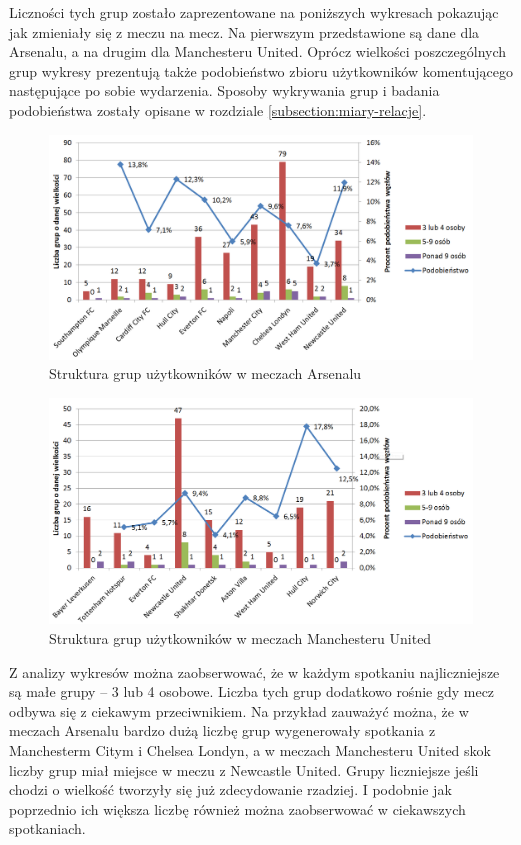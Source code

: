 Liczności tych grup zostało zaprezentowane na poniższych
wykresach pokazując jak zmieniały się z meczu na mecz.
Na pierwszym  przedstawione są dane
dla Arsenalu, a na drugim  dla Manchesteru United.
Oprócz wielkości poszczególnych grup wykresy prezentują także podobieństwo
zbioru użytkowników komentującego następujące po sobie wydarzenia.
Sposoby wykrywania grup i badania podobieństwa zostały opisane w rozdziale
\ref{subsection:miary-relacje}.
 
\begin{figure}[ht!]
\centering
\includegraphics[width=160mm]{img/grupy-arsenal-nums.png}
\caption{Struktura grup użytkowników w meczach Arsenalu}
\label{image:grupy-arsenal}
\end{figure}

\begin{figure}[ht!]
\centering
\includegraphics[width=160mm]{img/grupy-munited-nums.png}
\caption{Struktura grup użytkowników w meczach Manchesteru United}
\label{image:grupy-munited}
\end{figure}


Z analizy wykresów można zaobserwować, że w każdym spotkaniu najliczniejsze
są małe grupy -- 3 lub 4 osobowe. Liczba tych grup dodatkowo rośnie gdy
mecz odbywa się z ciekawym przeciwnikiem. Na przykład zauważyć można, że
w meczach Arsenalu  bardzo dużą liczbę grup wygenerowały
spotkania z Manchesterm Citym i Chelsea Londyn, a w meczach Manchesteru United
skok liczby grup miał miejsce w meczu z Newcastle United.
Grupy liczniejsze jeśli chodzi o wielkość tworzyły się już zdecydowanie rzadziej.
I podobnie jak poprzednio ich większa liczbę również można zaobserwować
w ciekawszych spotkaniach.

